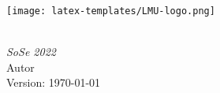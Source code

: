 \documentclass[12pt, openany, headinclude=true, oneside]{scrbook}
\begin{document}
\frontmatter

\begin{titlepage}
  \begin{center}
    \texttt{[image: latex-templates/LMU-logo.png]}
    \\
    \vspace*{4cm}
    {\Huge{}}\\
    \vspace*{1cm}

    {\Large\itshape{SoSe 2022}}\\
    \vspace*{2cm}
    {\Large Autor}\\
    \vspace*{5cm}
    \vfill
    Version: \today
  \end{center}
\end{titlepage}


\tableofcontents


\mainmatter

% 
\end{document}
